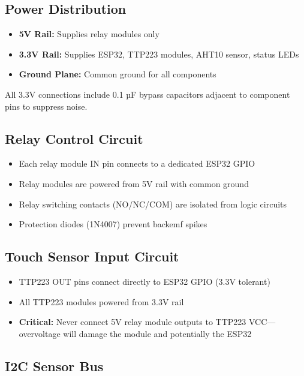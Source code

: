 \subsection{Power Distribution}

\begin{itemize}
    \item \textbf{5V Rail:} Supplies relay modules only
    \item \textbf{3.3V Rail:} Supplies ESP32, TTP223 modules, AHT10 sensor, status LEDs
    \item \textbf{Ground Plane:} Common ground for all components
\end{itemize}

All 3.3V connections include 0.1 µF bypass capacitors adjacent to component pins to suppress noise.

\subsection{Relay Control Circuit}

\begin{itemize}
    \item Each relay module IN pin connects to a dedicated ESP32 GPIO
    \item Relay modules are powered from 5V rail with common ground
    \item Relay switching contacts (NO/NC/COM) are isolated from logic circuits
    \item Protection diodes (1N4007) prevent backemf spikes
\end{itemize}

\subsection{Touch Sensor Input Circuit}

\begin{itemize}
    \item TTP223 OUT pins connect directly to ESP32 GPIO (3.3V tolerant)
    \item All TTP223 modules powered from 3.3V rail
    \item \textbf{Critical:} Never connect 5V relay module outputs to TTP223 VCC—overvoltage will damage the module and potentially the ESP32
\end{itemize}

\subsection{I2C Sensor Bus}

